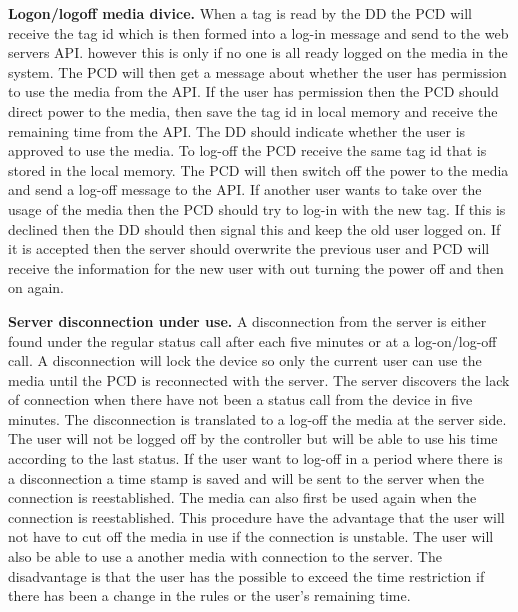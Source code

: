 \textbf{Logon/logoff media divice.} \newline
When a tag is read by the DD the PCD will receive the tag id which is then formed into a log-in message and send to the web servers API. however this is only if no one is all ready logged on the media in the system. The PCD will then get a message about whether the user has permission to use the media from the API. If the user has permission then the PCD should direct power to the media, then save the tag id in local memory and receive the remaining time from the API. The DD should indicate whether the user is approved to use the media.\newline 
To log-off the PCD receive the same tag id that is stored in the local memory. The PCD will then switch off the power to the media and send a log-off message to the API. \newline
If another user wants to take over the usage of the media then the PCD should try to log-in with the new tag. If this is declined then the DD should then signal this and keep the old user logged on. If it is accepted then the server should overwrite the previous user and PCD will receive the information for the new user with out turning the power off and then on again.\newline {}


\textbf{Server disconnection under use.} \newline
A disconnection from the server is either found under the regular status call after each five minutes or at a log-on/log-off call. A disconnection will lock the device so only the current user can use the media until the PCD is reconnected with the server. The server discovers the lack of connection when there have not been a status call from the device in five minutes. The disconnection is translated to a log-off the media at the server side. 
The user will not be logged off by the controller but will be able to use his time according to the last status. If the user want to log-off in a period where there is a disconnection a time stamp is saved and will be sent to the server when the connection is reestablished. The media can also first be used again when the connection is reestablished. 
This procedure have the advantage that the user will not have to cut off the media in use if the connection is unstable. The user will also be able to use a another media with connection to the server.
The disadvantage is that the user has the possible to exceed the time restriction if there has been a change in the rules or the user's remaining time. 
		
